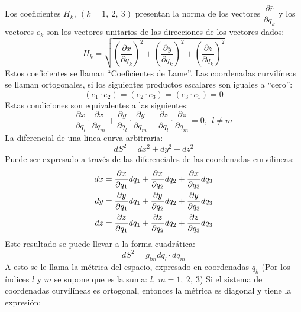 \documentclass[11pt]{article}
\begin{document}
Los coeficientes $H_k,\ (k = 1,\ 2,\ 3)$ presentan la norma de los vectores $\dfrac{\partial \bar{r}}{\partial q_k}$ y los vectores $\bar{e}_k$ son los vectores unitarios de las direcciones  de los vectores dados:
\begin{equation*}
    H_k = \sqrt{\left( \dfrac{\partial x}{\partial q_k} \right)^2 + \left( \dfrac{\partial y}{\partial q_k} \right)^2 + \left( \dfrac{\partial z}{\partial q_k} \right)^2 }
\end{equation*}
Estos coeficientes se llaman ``Coeficientes de Lame''. Las coordenadas curvilíneas se llaman ortogonales, si los siguientes productos escalares son iguales a ``cero'':
\begin{equation*}
    (\bar{e}_1\cdot \bar{e}_2) = (\bar{e}_2\cdot \bar{e}_3) = (\bar{e}_3\cdot \bar{e}_1) = 0
\end{equation*}
Estas condiciones son equivalentes a las siguientes:
\begin{equation*}
    \dfrac{\partial x}{\partial q_l}\cdot \dfrac{\partial x}{\partial q_m} + \dfrac{\partial y}{\partial q_l}\cdot \dfrac{\partial y}{\partial q_m} + \dfrac{\partial z}{\partial q_l}\cdot \dfrac{\partial z}{\partial q_m} = 0, \ \  l \neq m
\end{equation*}
La diferencial de una linea curva arbitraria:
\begin{equation*}
    dS^2 = dx^2 + dy^2 + dz^2
\end{equation*}
Puede ser expresado a través de las diferenciales de las coordenadas curvilineas:
\begin{align}
    dx = \dfrac{\partial x}{\partial q_1} dq_1 + \dfrac{\partial x}{\partial q_2} dq_2  + \dfrac{\partial x}{\partial q_3} dq_3 \notag \\ 
    dy = \dfrac{\partial y}{\partial q_1} dq_1 + \dfrac{\partial y}{\partial q_2} dq_2  + \dfrac{\partial y}{\partial q_3} dq_3 \notag \\ 
    dz = \dfrac{\partial z}{\partial q_1} dq_1 + \dfrac{\partial z}{\partial q_2} dq_2  + \dfrac{\partial z}{\partial q_3} dq_3 \notag
\end{align}
Este resultado se puede llevar a la forma cuadrática:
\begin{equation*}
    dS^2 = g_{lm} dq_l\cdot dq_m
\end{equation*}
A esto se le llama la métrica del espacio, expresado en coordenadas $q_k$ (Por los índices $l$ y $m$ se supone que es la suma: $l,\ m = 1,\ 2,\ 3$) Si el sistema de coordenadas curvilíneas es ortogonal, entonces la métrica es diagonal y tiene la expresión:
\end{document}
